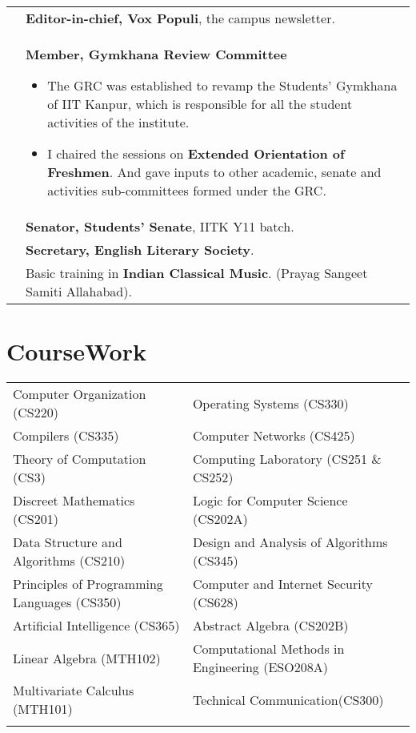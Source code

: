 \documentclass[a4paper,10pt]{article} %
\begin{document}
\begin{tabular}{>{\raggedleft}p{2.2cm}p{15cm}}
    2013 & \textbf{Editor-in-chief, Vox Populi}, the campus newsletter. \\

    2012 & \textbf{Member, Gymkhana Review Committee}
           \footnotesize{
               \begin{itemize}[leftmargin=*]
                   \item The GRC was established to revamp the Students' Gymkhana of IIT Kanpur,
                       which is responsible for all the student activities of the institute.
                   \item I chaired the sessions on \textbf{Extended Orientation of Freshmen}.
                       And gave inputs to other academic, senate and activities sub-committees formed under the GRC.
               \end{itemize}
           }\\

    2012 & \textbf{Senator, Students' Senate}, IITK Y11 batch. \\

    2012 & \textbf{Secretary, English Literary Society}. \\

    2010 & Basic training in \textbf{Indian Classical Music}. (Prayag Sangeet Samiti Allahabad). \\

\end{tabular}

\section{CourseWork}

\begin{tabular}{>{\raggedleft}p{8cm}|p{8cm}}

    Computer Organization (CS220) & Operating Systems (CS330) \\
    Compilers (CS335) & Computer Networks (CS425) \\
    Theory of Computation (CS3) & Computing Laboratory (CS251 \& CS252)\\
    Discreet Mathematics (CS201) & Logic for Computer Science (CS202A)\\
    Data Structure and Algorithms (CS210) & Design and Analysis of Algorithms (CS345)\\
    Principles of Programming Languages (CS350) & Computer and Internet Security (CS628)\\
    Artificial Intelligence (CS365) & Abstract Algebra (CS202B)\\
    Linear Algebra (MTH102) & Computational Methods in Engineering (ESO208A)\\
    Multivariate Calculus (MTH101) & Technical Communication(CS300)\\
                     \\
\end{tabular}
\end{document}
